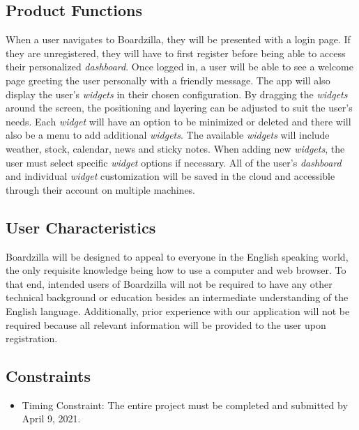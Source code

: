 \documentclass{article}
\begin{document}
	\subsection{Product Functions}
	\label{sub:product_functions}
	When a user navigates to Boardzilla, they will be presented with a login page. If they are unregistered, they will have to first register before being able to access their personalized \textit{dashboard}. Once logged in, a user will be able to see a welcome page greeting the user personally with a friendly message. The app will also display the user's \textit{widgets} in their chosen configuration. By dragging the \textit{widgets} around the screen, the positioning and layering can be adjusted to suit the user's needs. Each \textit{widget} will have an option to be minimized or deleted and there will also be a menu to add additional \textit{widgets}. The available \textit{widgets} will include weather, stock, calendar, news and sticky notes. When adding new \textit{widgets}, the user must select specific \textit{widget} options if necessary. All of the user's \textit{dashboard} and individual \textit{widget} customization will be saved in the cloud and accessible through their account on multiple machines.
	
	\subsection{User Characteristics}
	\label{sub:user_characteristics}
	Boardzilla will be designed to appeal to everyone in the English speaking world, the only requisite knowledge being how to use a computer and web browser. To that end, intended users of Boardzilla will not be required to have any other technical background or education besides an intermediate understanding of the English language. Additionally, prior experience with our application will not be required because all relevant information will be provided to the user upon registration. 
	
	\subsection{Constraints}
	\label{sub:constraints}
	\begin{itemize}
		\item Timing Constraint: The entire project must be completed and submitted by April 9, 2021.
	\end{itemize}
	
\end{document}
